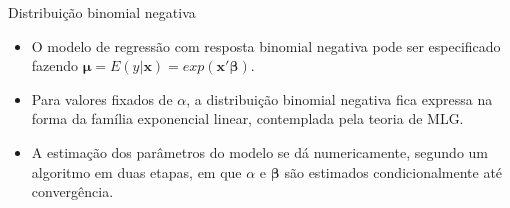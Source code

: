 \documentclass[10pt, aspectratio=169]{beamer}
\begin{document}


\begin{frame}{Distribuição binomial negativa} 

\begin{itemize}

\item O modelo de regressão com resposta binomial negativa pode ser especificado fazendo $\boldsymbol{\mu}=E(y|\boldsymbol{x})=exp(\boldsymbol{x'\beta}).$

\vspace{0.5cm}

\item Para valores fixados de $\alpha$, a distribuição binomial negativa fica expressa na forma da família exponencial linear, contemplada pela teoria de MLG.

\vspace{0.5cm}

\item A estimação dos parâmetros do modelo se dá numericamente, segundo um algoritmo em duas etapas, em que $\alpha$ e $\boldsymbol{\beta}$ são estimados condicionalmente até convergência.

\end{itemize}

\end{frame}
\end{document}
